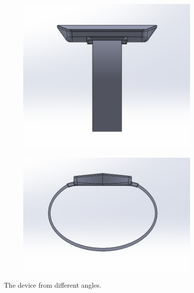 \documentclass[12pt,letterpaper]{article}
\begin{document}
\begin{figure}
	\centering
	\begin{subfigure}{.5\textwidth}
		\centering
		\includegraphics[width=1\linewidth]{CaptureV2.png}
		\label{fig:sub1}
	\end{subfigure}%
	\begin{subfigure}{.5\textwidth}
		\centering
		\includegraphics[width=1\linewidth]{CaptureV3.png}
		\label{fig:sub2}
	\end{subfigure}
	\caption{The device from different angles.}
	\label{fig:test}
\end{figure}
\end{document}
